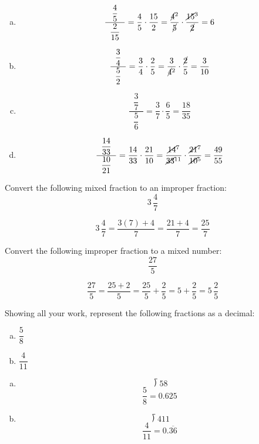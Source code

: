 \documentclass[11pt,letterpaper]{article}
\begin{document}
\sol
\begin{enumerate}[(a)]
\item 
	\[
	\dfrac{\;\;\dfrac{4}{5}\;\;}{\;\;\dfrac{2}{15}\;\;}= \dfrac{4}{5} \cdot \dfrac{15}{2}= \dfrac{\cancel{4}^2}{\cancel{5}} \cdot \dfrac{\cancel{15}^3}{\cancel{2}}= 6
	\] \pspace

\item 
	\[
	\dfrac{\;\;\dfrac{3}{4}\;\;}{\;\;\dfrac{5}{2}\;\;}= \dfrac{3}{4} \cdot \dfrac{2}{5}= \dfrac{3}{\cancel{4}^2} \cdot \dfrac{\cancel{2}}{5}= \dfrac{3}{10}
	\] \pspace

\item 
	\[
	\dfrac{\;\;\dfrac{3}{7}\;\;}{\;\;\dfrac{5}{6}\;\;}= \dfrac{3}{7} \cdot \dfrac{6}{5}= \dfrac{18}{35}
	\] \pspace

\item 
	\[
	\dfrac{\;\;\dfrac{14}{33}\;\;}{\;\;\dfrac{10}{21}\;\;}= \dfrac{14}{33} \cdot \dfrac{21}{10}= \dfrac{\cancel{14}^7}{\cancel{33}^{11}} \cdot \dfrac{\cancel{21}^7}{\cancel{10}^5}= \dfrac{49}{55}
	\]
\end{enumerate}



\newpage



 Convert the following mixed fraction to an improper fraction:
	\[
	3\,\frac{4}{7}
	\]

\sol
	\[
	3\,\frac{4}{7}= \dfrac{3(7) + 4}{7}= \dfrac{21 + 4}{7}= \dfrac{25}{7}
	\]



\newpage



 Convert the following improper fraction to a mixed number:
	\[
	\dfrac{27}{5}
	\]

\sol
	\[
	\dfrac{27}{5}= \dfrac{25 + 2}{5}= \dfrac{25}{5} + \dfrac{2}{5}= 5 + \dfrac{2}{5}= 5\,\frac{2}{5}
	\]



\newpage



 Showing all your work, represent the following fractions as a decimal:
	\begin{enumerate}[(a)]
	\item $\dfrac{5}{8}$
	\item $\dfrac{4}{11}$
	\end{enumerate} \pspace

\sol
\begin{enumerate}[(a)]
\item 
	\[
	\longdivision{5}{8}
	\] \pspace
	\[
	\dfrac{5}{8}= 0.625
	\] \pspace

\item 
	\[
	\longdivision{4}{11}
	\] \pspace
	\[
	\dfrac{4}{11}= 0.\overline{36}
	\]
\end{enumerate}
\end{document}
